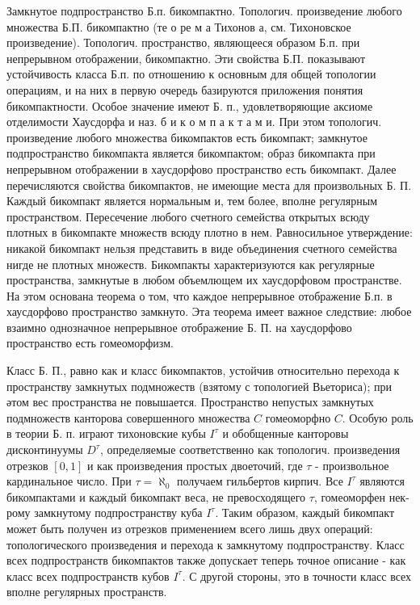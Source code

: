 \documentclass[10pt]{article}
\begin{document}
Замкнутое подпространство Б.п. бикомпактно. Топологич. произведение любого множества Б.П. бикомпактно (те о ре м а Тихонов а, см. Тихоновское произведение). Топологич. пространство, являющееся образом Б.п. при непрерывном отображении, бикомпактно. Эти свойства Б.П. показывают устойчивость класса Б.п. по отношению к основным для общей топологии операциям, и на них в первую очередь базируются приложения понятия бикомпактности. Особое значение имеют Б. п., удовлетворяющие аксиоме отделимости Хаусдорфа и наз. б и к о м п а к т а м и. При этом топологич. произведение любого множества бикомпактов есть бикомпакт; замкнутое подпространство бикомпакта является бикомпактом; образ бикомпакта при непрерывном отображении в хаусдорфово пространство есть бикомпакт. Далее перечисляются свойства бикомпактов, не имеющие места для произвольных Б. П. Каждый бикомпакт является нормальным и, тем более, вполне регулярным пространством. Пересечение любого счетного семейства открытых всюду плотных в бикомпакте множеств всюду плотно в нем. Равносильное утверждение: никакой бикомпакт нельзя представить в виде объединения счетного семейства нигде не плотных множеств. Бикомпакты характеризуются как регулярные пространства, замкнутые в любом объемлющем их хаусдорфовом пространстве. На этом основана теорема о том, что каждое непрерывное отображение Б.п. в хаусдорфово пространство замкнуто. Эта теорема имеет важное следствие: любое взаимно однозначное непрерывное отображение Б. П. на хаусдорфово пространство есть гомеоморфизм.



Класс Б. П., равно как и класс бикомпактов, устойчив относительно перехода к пространству замкнутых подмножеств (взятому с топологией Вьеториса); при әтом вес пространства не повышается. Пространство непустых замкнутых подмножеств канторова совершенного множества $C$ гомеоморфно $C$. Особую роль в теории Б. п. играют тихоновские кубы $I^{\tau}$ и обобщенные канторовы дисконтинуумы $D^{\tau}$, определяемые соответственно как топологич. произведения отрезков $[0,1]$ и как произведения простых двоеточий, где $\tau$ - произвольное кардинальное число. При $\tau=\boldsymbol{\aleph}_{0}$ получаем гильбертов кирпич. Все $I^{\tau}$ являются бикомпактами и каждый бикомпакт веса, не превосходящего $\tau$, гомеоморфен нек-рому замкнутому подпространству куба $I^{\tau}$. Таким образом, каждый бикомпакт может быть получен из отрезков применением всего лишь двух операций: топологического произведения и перехода к замкнутому подпространству. Класс всех подпространств бикомпактов также допускает теперь точное описание - как класс всех подпространств кубов $I^{\tau}$. С другой стороны, это в точности класс всех вполне регулярных пространств.
\end{document}
